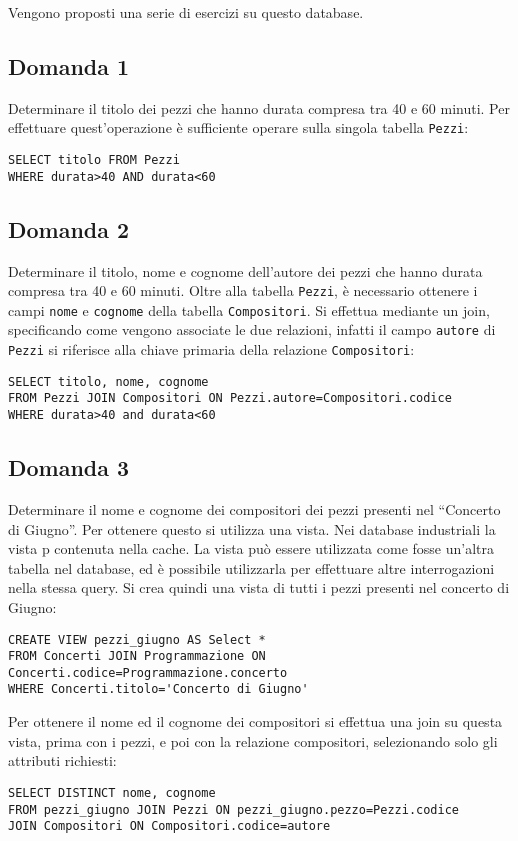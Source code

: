 \documentclass{article}
\numberwithin{equation}{subsection}
\begin{document}
Vengono proposti una serie di esercizi su questo database. 

\subsection*{Domanda 1}
Determinare il titolo dei pezzi che hanno durata compresa tra 40 e 60 minuti. Per effettuare quest'operazione è sufficiente operare sulla singola tabella \verb|Pezzi|:
\begin{verbatim}
SELECT titolo FROM Pezzi
WHERE durata>40 AND durata<60
\end{verbatim}

\subsection*{Domanda 2}
Determinare il titolo, nome e cognome dell'autore dei pezzi che hanno durata compresa tra 40 e 60 minuti. Oltre alla tabella \verb|Pezzi|, è necessario ottenere i campi 
\verb|nome| e \verb|cognome| della tabella \verb|Compositori|. Si effettua mediante un join, specificando come vengono associate le due relazioni, infatti il campo \verb|autore| 
di \verb|Pezzi| si riferisce alla chiave primaria della relazione \verb|Compositori|:
\begin{verbatim}
SELECT titolo, nome, cognome  
FROM Pezzi JOIN Compositori ON Pezzi.autore=Compositori.codice
WHERE durata>40 and durata<60
\end{verbatim}

\subsection*{Domanda 3}
Determinare il nome e cognome dei compositori dei pezzi presenti nel ``Concerto di Giugno''. Per ottenere questo si utilizza una vista. Nei database industriali 
la vista p contenuta nella cache. La vista può essere utilizzata come fosse un'altra tabella nel database, ed è possibile utilizzarla per effettuare altre 
interrogazioni nella stessa query. Si crea quindi una vista di tutti i pezzi presenti nel concerto di Giugno:
\begin{verbatim}
CREATE VIEW pezzi_giugno AS Select *
FROM Concerti JOIN Programmazione ON Concerti.codice=Programmazione.concerto
WHERE Concerti.titolo='Concerto di Giugno'
\end{verbatim}
Per ottenere il nome ed il cognome dei compositori si effettua una join su questa vista, prima con i pezzi, e poi con la relazione compositori, selezionando solo gli 
attributi richiesti:
\begin{verbatim}
SELECT DISTINCT nome, cognome
FROM pezzi_giugno JOIN Pezzi ON pezzi_giugno.pezzo=Pezzi.codice
JOIN Compositori ON Compositori.codice=autore
\end{verbatim}
\end{document}
